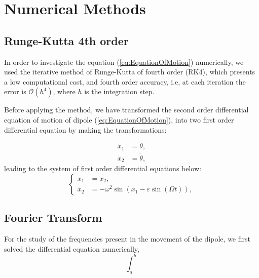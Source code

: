 \section{Numerical Methods}

\subsection{Runge-Kutta 4th order}
In order to investigate the equation (\ref{eq:EquationOfMotion}) numerically, we used the iterative method of Runge-Kutta of fourth order (RK4), which presents a low computational cost, and fourth order accuracy, i.e, at each iteration the error is $\mathcal{O}(h^4)$, where $h$ is the integration step.

Before applying the method, we have transformed the second order differential equation of motion of dipole (\ref{eq:EquationOfMotion}), into two first order differential equation by making the transformations:

\begin{equation}
    \begin{aligned}
        x_1 &= \theta,\\
        x_2 &= \dot{\theta}, 
    \end{aligned}
\end{equation}
leading to the system of first order differential equations below:
\begin{equation}
    \begin{cases}
        \dot{x_1} &= x_2,\\
        \dot{x_2} &= -\omega^2 \sin(x_1 - \varepsilon \sin(\Omega t)),
    \end{cases}
\end{equation}

\subsection{Fourier Transform}
For the study of the frequencies present in the movement of the dipole, we first solved the differential equation numerically, 
\begin{equation}
    \int_{a}^{b}
\end{equation}